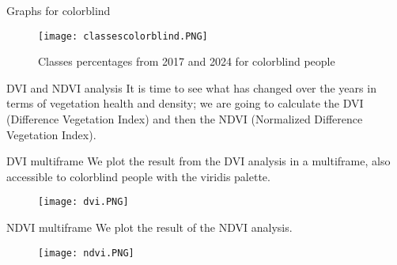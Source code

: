 \documentclass{beamer}
\begin{document}
\begin{frame}{Graphs for colorblind}
\begin{figure}
        \centering
        \texttt{[image: classescolorblind.PNG]}
        \caption{Classes percentages from 2017 and 2024 for colorblind people}
        \label{fig:enter-label}
        \end{figure}
\end{frame}

\begin{frame}{DVI and NDVI analysis}
    It is time to see what has changed over the years in terms of vegetation health and density; we are going to calculate the DVI (Difference Vegetation Index) and then the NDVI (Normalized Difference Vegetation Index).

    
\end{frame}

\begin{frame}{DVI multiframe}
We plot the result from the DVI analysis in a multiframe, also accessible to colorblind people with the viridis palette.

  
\vspace{-0.3cm}
   \begin{figure}
        \centering
        \texttt{[image: dvi.PNG]}
        \label{fig:enter-label}
    \end{figure} 
\end{frame}

\begin{frame}{NDVI multiframe}
We plot the result of the NDVI analysis.

    
\vspace{-0.3cm}
    \begin{figure}
        \centering
        \texttt{[image: ndvi.PNG]}
        \label{fig:enter-label}
    \end{figure}
    
\end{frame}
\end{document}
